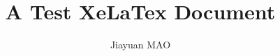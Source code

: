\documentclass[a4paper, 12pt, titlepage]{article}
\begin{document}
\setlength{\parindent}{2em}

\title{A Test XeLaTex Document}
\author{Jiayuan MAO}
\maketitle

\tableofcontents
\listoffigures
\listoftables
\end{document}
